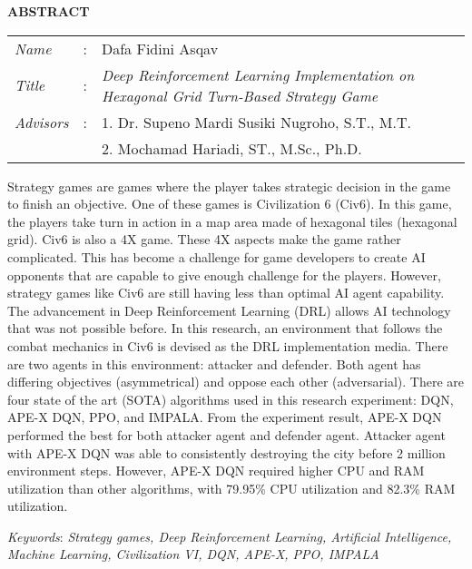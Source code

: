 \begin{center}
  \large\textbf{ABSTRACT}
\end{center}


\vspace{2ex}

\begingroup
  \setlength{\tabcolsep}{0pt}

  \noindent
  \begin{tabularx}{\textwidth}{l >{\centering}m{3em} X}
    \emph{Name}     &:& Dafa Fidini Asqav \\

    \emph{Title}    &:& \emph{Deep Reinforcement Learning Implementation on Hexagonal Grid Turn-Based Strategy Game} \\

    \emph{Advisors} &:& 1. Dr. Supeno Mardi Susiki Nugroho, S.T., M.T. \\
                    & & 2. Mochamad Hariadi, ST., M.Sc., Ph.D. \\
  \end{tabularx}
\endgroup

Strategy games are games where the player takes strategic decision in the game to finish an objective.
One of these games is Civilization 6 (Civ6).
In this game, the players take turn in action in a map area made of hexagonal tiles (hexagonal grid).
Civ6 is also a 4X game. These 4X aspects make the game rather complicated.
This has become a challenge for game developers to create AI opponents that are capable to give enough challenge for the players.
However, strategy games like Civ6 are still having less than optimal AI agent capability.
The advancement in Deep Reinforcement Learning (DRL) allows AI technology that was not possible before.
In this research, an environment that follows the combat mechanics in Civ6 is devised as the
DRL implementation media. There are two agents in this environment: attacker and defender.
Both agent has differing objectives (asymmetrical) and oppose each other (adversarial).
There are four state of the art (SOTA) algorithms used in this research experiment: DQN, APE-X DQN,
PPO, and IMPALA.
From the experiment result, APE-X DQN performed the best for both attacker agent and defender agent.
Attacker agent with APE-X DQN was able to consistently destroying the city before 2 million environment steps.
However, APE-X DQN required higher CPU and RAM utilization than other algorithms,
with 79.95\% CPU utilization and 82.3\% RAM utilization.

\emph{Keywords}: \emph{Strategy games, Deep Reinforcement Learning, Artificial Intelligence, Machine Learning, Civilization VI, DQN, APE-X, PPO, IMPALA}
